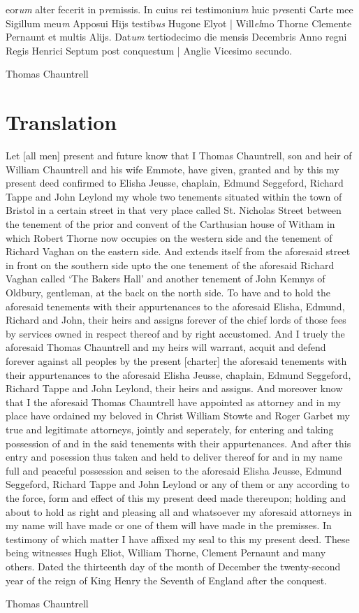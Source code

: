 \documentclass[a4paper,12pt]{article}
\begin{document}
\begin{sloppypar}
eor\textit{um} alter fecerit in p\textit{re}missis. In cuius rei testimoniu\textit{m} huic p\textit{re}senti Carte mee Sigillum meu\textit{m} Apposui Hijs testib\textit{us} Hugone Elyot | Will\textit{el}mo Thorne Clemente Pernaunt et multis Alijs. Dat\textit{um} tertiodecimo die mensis Decembris Anno regni Regis Henrici Septum post conquestum | Anglie Vicesimo secundo.\end{sloppypar}

Thomas Chauntrell

\section*{Translation}

Let [all men] present and future know that I Thomas Chauntrell, son and heir of William Chauntrell and his wife Emmote, have given, granted and by this my present deed confirmed to Elisha Jeusse, chaplain, Edmund Seggeford, Richard Tappe and John Leylond my whole two tenements situated within the town of Bristol in a certain street in that very place called St. Nicholas Street between the tenement of the prior and convent of the Carthusian house of Witham in which Robert Thorne now occupies on the western side and the tenement of Richard Vaghan on the eastern side. And extends itself from the aforesaid street in front on the southern side upto the one tenement of the aforesaid Richard Vaghan called `The Bakers Hall' and another tenement of John Kemnys of Oldbury, gentleman, at the back on the north side. To have and to hold the aforesaid tenements with their appurtenances to the aforesaid Elisha, Edmund, Richard and John, their heirs and assigns forever of the chief lords of those fees by services owned in respect thereof and by right accustomed. And I truely the aforesaid Thomas Chauntrell and my heirs will warrant, acquit and defend forever  against all peoples by the present [charter] the aforesaid tenements with their appurtenances to the aforesaid Elisha Jeusse, chaplain, Edmund Seggeford, Richard Tappe and John Leylond, their heirs and assigns. And moreover know that I the aforesaid Thomas Chauntrell have appointed as attorney and in my place have ordained my beloved in Christ William Stowte and Roger Garbet my true and legitimate attorneys, jointly and seperately, for entering and taking possession of and in the said tenements with their appurtenances. And after this entry and posession thus taken and held to deliver thereof for and in my name full and peaceful possession and seisen to the aforesaid Elisha Jeusse, Edmund Seggeford, Richard Tappe and John Leylond or any of them or any according to the force, form and effect of this my present deed made thereupon; holding and about to hold as right and pleasing all and whatsoever my aforesaid attorneys in my name will have made or one of them will have made in the premisses. In testimony of which matter I have affixed my seal to this my present deed. These being witnesses Hugh Eliot, William Thorne, Clement Pernaunt and many others. Dated the thirteenth day of the month of December the twenty-second year of the reign of King Henry the Seventh of England after the conquest. 

Thomas Chauntrell
\end{document}
